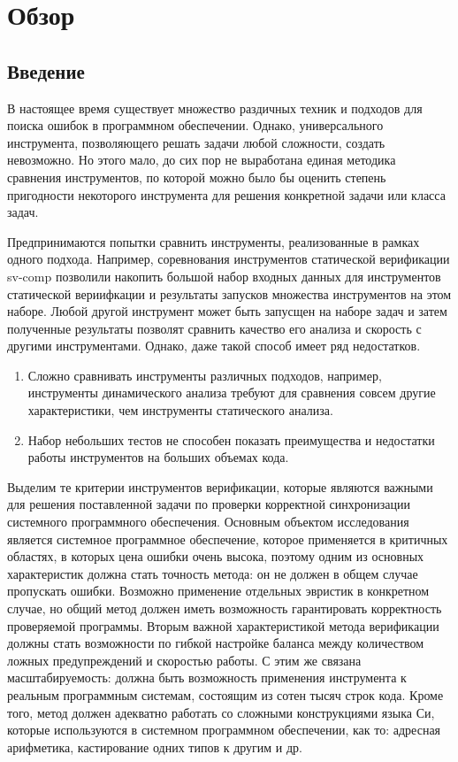 \chapter{Обзор}
\label{chapter_related_work}

\section{Введение}
\label{rw:introduction}


В настоящее время существует множество раздичных техник и подходов для поиска ошибок в программном обеспечении.
Однако, универсального инструмента, позволяющего решать задачи любой сложности, создать невозможно.
Но этого мало, до сих пор не выработана единая методика сравнения инструментов, по которой можно было бы оценить степень пригодности некоторого инструмента для решения конкретной задачи или класса задач.

Предпринимаются попытки сравнить инструменты, реализованные в рамках одного подхода.
Например, соревнования инструментов статической верификации sv-comp позволили накопить большой набор входных данных для инструментов статической вериифкации и результаты запусков множества инструментов на этом наборе.
Любой другой инструмент может быть запусщен на наборе задач и затем полученные результаты позволят сравнить качество его анализа и скорость с другими инструментами.
Однако, даже такой способ имеет ряд недостатков. 
\begin{enumerate}
\item Сложно сравнивать инструменты различных подходов, например, инструменты динамического анализа требуют для сравнения совсем другие характеристики, чем инструменты статического анализа.
\item Набор небольших тестов не способен показать преимущества и недостатки работы инструментов на больших объемах кода.
\end{enumerate}

Выделим те критерии инструментов верификации, которые являются важными для решения поставленной задачи по проверки корректной синхронизации системного программного обеспечения.
Основным объектом исследования является системное программное обеспечение, которое применяется в критичных областях, в которых цена ошибки очень высока, поэтому одним из основных характеристик должна стать точность метода: он не должен в общем случае пропускать ошибки.
Возможно применение отдельных эвристик в конкретном случае, но общий метод должен иметь возможность гарантировать корректность проверяемой программы.
Вторым важной характеристикой метода верификации должны стать возможности по гибкой настройке баланса между количеством ложных предупреждений и скоростью работы.
С этим же связана масштабируемость: должна быть возможность применения инструмента к реальным программным системам, состоящим из сотен тысяч строк кода.
Кроме того, метод должен адекватно работать со сложными конструкциями языка Си, которые используются в системном программном обеспечении, как то: адресная арифметика, кастирование одних типов к другим и др.


